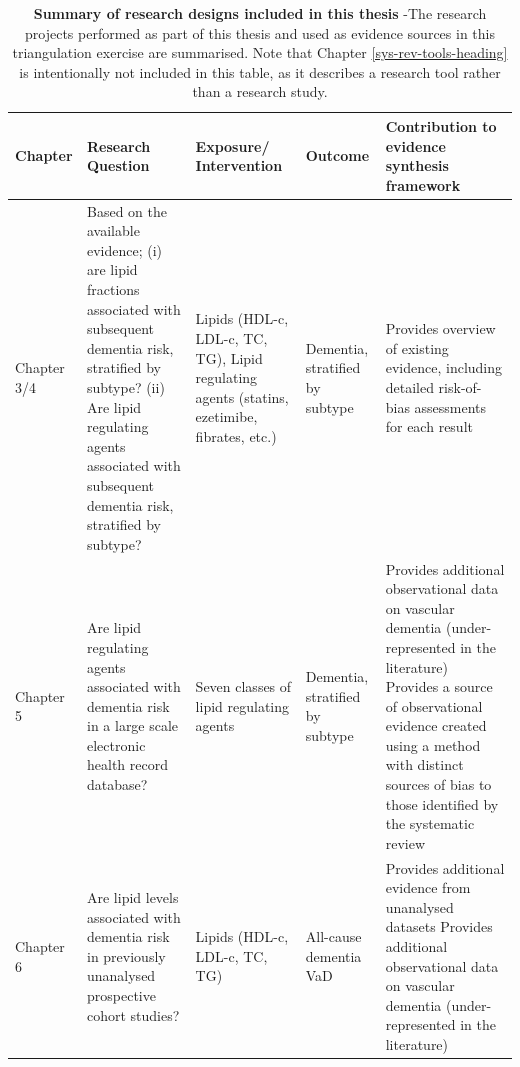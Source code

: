 \documentclass[a4paper, twoside]{templates/ociamthesis}
\begin{document}
\begin{table}[H]

\caption[Summary of research designs included in this thesis]{\label{tab:thesisOverview-table}\textbf{Summary of research designs included in this thesis} -The research projects performed as part of this thesis and used as evidence sources in this triangulation exercise are summarised. Note that Chapter \ref{sys-rev-tools-heading} is intentionally not included in this table, as it describes a research tool rather than a research study.}
\centering
\begin{tabular}[t]{>{\raggedright\arraybackslash}p{6em}>{\raggedright\arraybackslash}p{16em}>{\raggedright\arraybackslash}p{7em}>{\raggedright\arraybackslash}p{7em}>{\raggedright\arraybackslash}p{16em}}
\toprule
\textbf{Chapter} & \textbf{Research Question} & \textbf{Exposure/ Intervention} & \textbf{Outcome} & \textbf{Contribution to evidence synthesis framework}\\
\midrule
Chapter 3/4 & Based on the available evidence; \newline (i) are lipid fractions associated with subsequent dementia risk, stratified by subtype? \newline (ii) Are lipid regulating agents associated with subsequent dementia risk, stratified by subtype? \newline & Lipids (HDL-c, LDL-c, TC, TG), \newline \newline Lipid regulating agents (statins, ezetimibe, fibrates, etc.) & Dementia, stratified by subtype & Provides overview of existing evidence, including detailed risk-of-bias assessments for each result\\
\midrule
Chapter 5 & Are lipid regulating agents associated with dementia risk in a large scale electronic health record database? \newline & Seven classes of lipid regulating agents & Dementia, stratified by subtype & Provides additional observational data on vascular dementia (under-represented in the literature) \newline \newline Provides a source of observational evidence created using a method with distinct sources of bias to those identified by the systematic review\\
\midrule
Chapter 6 & Are lipid levels associated with dementia risk in previously unanalysed prospective cohort studies? \newline & Lipids (HDL-c, LDL-c, TC, TG) & All-cause dementia \newline VaD & Provides additional evidence from unanalysed datasets \newline \newline Provides additional observational data on vascular dementia (under-represented in the literature)\\
\bottomrule
\end{tabular}
\end{table}
\end{document}
